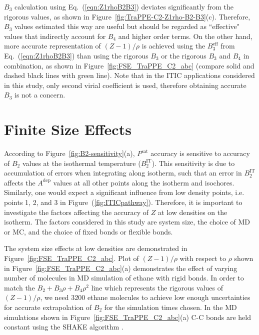 \documentclass[5p,times]{elsarticle}
\begin{document}
$B_3$ calculation using Eq.~(\ref{eqn:Z1rhoB2B3}) deviates significantly from the rigorous values, as shown in Figure~\ref{fig:TraPPE-C2-Z1rho-B2-B3}(c). Therefore, $B_3$ values estimated this way are useful but should be regarded as ``effective" values that indirectly account for $B_4$ and higher order terms. On the other hand, more accurate representation of $(Z-1)/\rho$ is achieved using the $B_3^\mathrm{eff}$ from Eq.~(\ref{eqn:Z1rhoB2B3}) than using the rigorous $B_3$ or the rigorous $B_3$ and $B_4$ in combination, as shown in Figure~\ref{fig:FSE_TraPPE_C2_abc} (compare solid and dashed black lines with green line). Note that in the ITIC applications considered in this study, only second virial coefficient is used, therefore obtaining accurate $B_3$ is not a concern.


\section{Finite Size Effects}\label{sec:FSE}
According to Figure~\ref{fig:B2-sensitivity}(a), $P^{\mathrm{sat}}$ accuracy is sensitive to accuracy of $B_2$ values at the isothermal temperature ($B_2^{\mathrm{IT}}$). This sensitivity is due to accumulation of errors when integrating along isotherm, such that an error in $B_2^{\mathrm{IT}}$ affects the $A^{\mathrm{dep}}$ values at all other points along the isotherm and isochores. Similarly, one would expect a significant influence from low density points, i.e. points 1, 2, and 3 in Figure~(\ref{fig:ITICpathway}). Therefore, it is important to investigate the factors affecting the accuracy of $Z$ at low densities on the isotherm. The factors considered in this study are system size, the choice of MD or MC, and the choice of fixed bonds or flexible bonds. 

The system size effects at low densities are demonstrated in Figure~\ref{fig:FSE_TraPPE_C2_abc}. Plot of $(Z-1)/\rho$ with respect to $\rho$ shown in Figure~\ref{fig:FSE_TraPPE_C2_abc}(a) demonstrates the effect of varying number of molecules in MD simulation of ethane with rigid bonds. In order to match the $B_2+B_3 \rho+B_4 \rho^2$ line which represents the rigorous values of $(Z-1)/\rho$, we need 3200 ethane molecules to achieve low enough uncertainties for accurate extrapolation of $B_2$ for the simulation times chosen. In the MD simulations shown in Figure~\ref{fig:FSE_TraPPE_C2_abc}(a) C-C bonds are held constant using the SHAKE algorithm \cite{Ryckaert1977}. 
\end{document}
